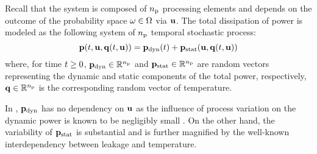 Recall that the system is composed of ${n_\text{p}}$ processing elements and depends on the outcome of the probability space $\omega \in \Omega$ via $\mathbf{u}$.
The total dissipation of power is modeled as the following system of ${n_\text{p}}$ temporal stochastic process:
\begin{equation} \elab{power-model}
  \vp(\t, \vu, \vq(\t, \vu)) = \vp_\dynamic(\t) + \vp_\static(\vu, \vq(\t, \vu))
\end{equation}
where, for time $t \geq 0$, $\mathbf{p}_{\text{dyn}} \in \mathbb{R}^{n_\text{p}}$ and $\mathbf{p}_{\text{stat}} \in \mathbb{R}^{n_\text{p}}$ are random vectors representing the dynamic and static components of the total power, respectively, $\mathbf{q} \in \mathbb{R}^{n_\text{p}}$ is the corresponding random vector of temperature.
\begin{remark}
In , \textnormal{$\mathbf{p}_{\text{dyn}}$} has no dependency on $\mathbf{u}$ as the influence of process variation on the dynamic power is known to be negligibly small \cite{srivastava2010}.
On the other hand, the variability of \textnormal{$\mathbf{p}_{\text{stat}}$} is substantial and is further magnified by the well-known interdependency between leakage and temperature.
\end{remark}
